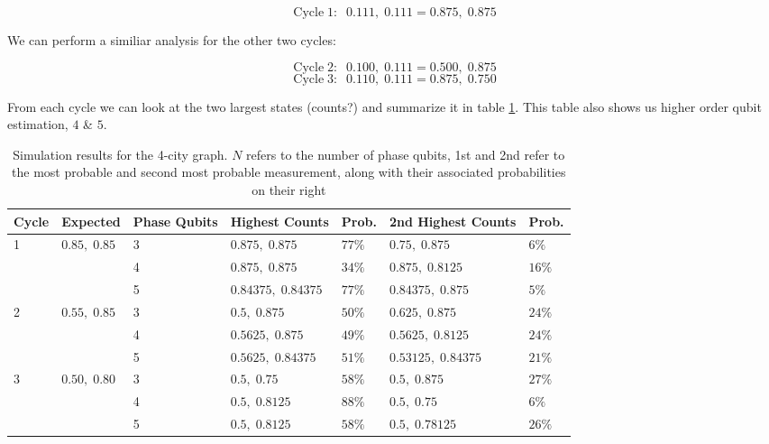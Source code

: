 \documentclass[msc,oneside]{ubcthesis}
\begin{document}
 $$\mathrm{Cycle}\; 1: \;\; 0.111, \; 0.111 = 0.875, \; 0.875$$
 
 We can perform a similiar analysis for the other two cycles:
 
 $$\mathrm{Cycle}\; 2: \;\; 0.100, \; 0.111 = 0.500, \; 0.875$$
 $$\mathrm{Cycle}\; 3: \;\; 0.110, \; 0.111 = 0.875, \; 0.750$$
 
 From each cycle we can look at the two largest states (counts?) and summarize it in table \ref{table:sim-results-4-city}. This table also shows us higher order qubit estimation, $4$ \& $5$.
 
\begin{table}[ht!]
	\centering
	\begin{tabular}{lllllll} %
		\toprule
		Cycle & Expected & Phase Qubits & Highest Counts & Prob. & 2nd Highest Counts & Prob. \\
		\midrule
		\multirow{3}{*}{1} & \multirow{3}{*}{$0.85, \; 0.85$} & 3 & $0.875, \; 0.875$ & $77\%$ &  $0.75, \; 0.875$  & $6\%$ \\
		&                          & 4& $0.875, \; 0.875$ & $34\%$ &  $0.875, \; 0.8125$  & $16\%$ \\
		&                          & 5 & $0.84375, \; 0.84375$ & $77\%$ &  $0.84375, \; 0.875$  & $5\%$ \\
		\hline
		\multirow{3}{*}{2} & \multirow{3}{*}{$0.55, \; 0.85$} & 3 & $0.5, \; 0.875$ & $50\%$ &  $0.625, \; 0.875$  & $24\%$ \\
		&                          & 4& $0.5625, \; 0.875$ & $49\%$ &  $0.5625, \; 0.8125$  & $24\%$ \\
		&                          & 5 & $0.5625, \; 0.84375$ & $51\%$ &  $0.53125, \; 0.84375$  & $21\%$ \\
		\hline
		\multirow{3}{*}{3} & \multirow{3}{*}{$0.50, \; 0.80$ } & 3 & $0.5, \; 0.75$ & $58\%$ &  $0.5, \; 0.875$  & $27\%$ \\
		&                          & 4& $0.5, \; 0.8125$ & $88\%$ &  $0.5, \; 0.75$  & $6\%$ \\
		&                          & 5 & $0.5, \; 0.8125$ & $58\%$ &  $0.5, \; 0.78125$  & $26\%$ \\
		\bottomrule
	\end{tabular}
	\caption{Simulation results for the 4-city graph. $N$ refers to the number of phase qubits, 1st and 2nd refer to the most probable and second most probable measurement, along with their associated probabilities on their right}
	\label{table:sim-results-4-city}
\end{table} 
\end{document}
